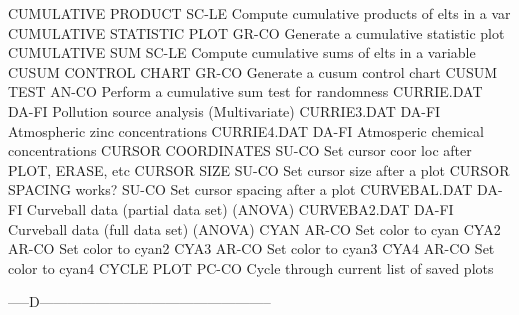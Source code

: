 CUMULATIVE PRODUCT          SC-LE Compute cumulative products of elts in a var
CUMULATIVE STATISTIC PLOT   GR-CO Generate a cumulative statistic plot
CUMULATIVE SUM              SC-LE Compute cumulative sums of elts in a variable
CUSUM CONTROL CHART         GR-CO Generate a cusum control chart
CUSUM TEST                  AN-CO Perform a cumulative sum test for randomness
CURRIE.DAT                  DA-FI Pollution source analysis (Multivariate)
CURRIE3.DAT                 DA-FI Atmospheric zinc concentrations
CURRIE4.DAT                 DA-FI Atmosperic chemical concentrations
CURSOR COORDINATES          SU-CO Set cursor coor loc after PLOT, ERASE, etc
CURSOR SIZE                 SU-CO Set cursor size after a plot
CURSOR SPACING works?       SU-CO Set cursor spacing after a plot
CURVEBAL.DAT                DA-FI Curveball data (partial data set) (ANOVA)
CURVEBA2.DAT                DA-FI Curveball data (full data set) (ANOVA)
CYAN                        AR-CO Set color to cyan
CYA2                        AR-CO Set color to cyan2
CYA3                        AR-CO Set color to cyan3
CYA4                        AR-CO Set color to cyan4
CYCLE PLOT                  PC-CO Cycle through current list of saved plots

-----D--------------------------------------------------

